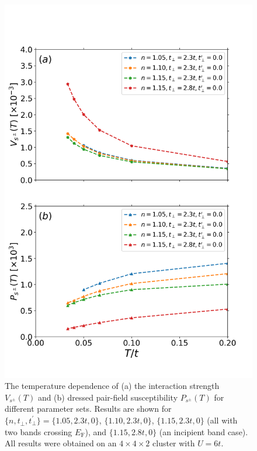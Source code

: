 \documentclass[prb,twocolumn,amsmath,amssymb,superscriptaddress,floatfix,nofootinbib]{revtex4-2}
\begin{document}
\begin{figure}[t]
\centering
\vspace{-0.75cm}
\includegraphics[scale=0.42]{V_vs_P_varyT.png}
\vspace{-0.75cm}
\caption{The temperature dependence of (a) the interaction strength $V_{s^\pm}(T)$ 
and (b) dressed pair-field susceptibility $P_{s^\pm}(T)$ for different parameter sets. Results are shown for  $\{n,t^{\phantom\prime}_\perp,t_\perp^\prime\} = \{1.05, 2.3t, 0\}$, $\{1.10,2.3t,0\}$, $\{1.15,2.3t,0\}$ (all with two bands crossing $E_\mathrm{F}$), and $\{1.15,2.8t,0\}$ (an incipient band case). All results were obtained on an $4\times 4\times 2$ cluster with $U = 6t$. 
}
\label{fig:separable_VandP}
\end{figure}
\end{document}
